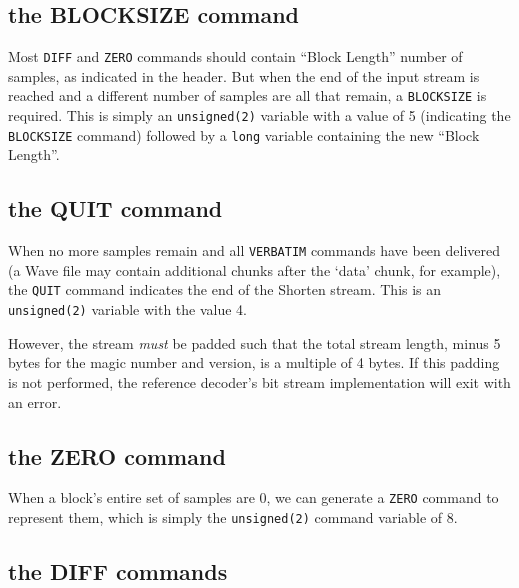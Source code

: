 \subsection{the BLOCKSIZE command}

Most \texttt{DIFF} and \texttt{ZERO} commands should contain
``Block Length'' number of samples, as indicated in the header.
But when the end of the input stream is reached and a different
number of samples are all that remain, a \texttt{BLOCKSIZE}
is required.
This is simply an \texttt{unsigned(2)} variable with a value of 5
(indicating the \texttt{BLOCKSIZE} command)
followed by a \texttt{long} variable containing the new ``Block Length''.

\subsection{the QUIT command}

When no more samples remain and all \texttt{VERBATIM} commands have
been delivered (a Wave file may contain additional chunks after
the `data' chunk, for example), the \texttt{QUIT} command indicates
the end of the Shorten stream.
This is an \texttt{unsigned(2)} variable with the value 4.

However, the stream \textit{must} be padded such that the total
stream length, minus 5 bytes for the magic number and version,
is a multiple of 4 bytes.
If this padding is not performed, the reference decoder's bit stream
implementation will exit with an error.

\subsection{the ZERO command}

When a block's entire set of samples are 0, we can generate
a \texttt{ZERO} command to represent them, which is
simply the \texttt{unsigned(2)} command variable of 8.

\pagebreak

\subsection{the DIFF commands}

